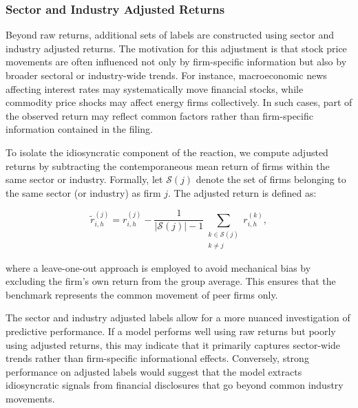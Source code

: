 \subsubsection*{Sector and Industry Adjusted Returns}

Beyond raw returns, additional sets of labels are constructed using sector and industry adjusted returns. The motivation for this adjustment is that stock price movements are often influenced not only by firm-specific information but also by broader sectoral or industry-wide trends. For instance, macroeconomic news affecting interest rates may systematically move financial stocks, while commodity price shocks may affect energy firms collectively. In such cases, part of the observed return may reflect common factors rather than firm-specific information contained in the filing.

To isolate the idiosyncratic component of the reaction, we compute adjusted returns by subtracting the contemporaneous mean return of firms within the same sector or industry. Formally, let $\mathcal{S}(j)$ denote the set of firms belonging to the same sector (or industry) as firm $j$. The adjusted return is defined as:

\begin{equation}
\tilde{r}_{i,h}^{(j)} = r_{i,h}^{(j)} - 
\frac{1}{|\mathcal{S}(j)| - 1}
\sum_{\substack{k \in \mathcal{S}(j) \\ k \neq j}} r_{i,h}^{(k)},
\end{equation}

where a leave-one-out approach is employed to avoid mechanical bias by excluding the firm's own return from the group average. This ensures that the benchmark represents the common movement of peer firms only.

The sector and industry adjusted labels allow for a more nuanced investigation of predictive performance. If a model performs well using raw returns but poorly using adjusted returns, this may indicate that it primarily captures sector-wide trends rather than firm-specific informational effects. Conversely, strong performance on adjusted labels would suggest that the model extracts idiosyncratic signals from financial disclosures that go beyond common industry movements.